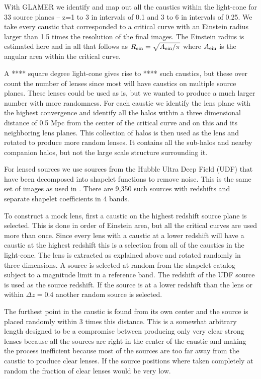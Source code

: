 \documentclass[useAMS,usenatbib]{mnras}
\begin{document}
With GLAMER we identify and map out all the caustics within the light-cone for 33 source planes -- z=1 to 3 in intervals of 0.1 and 3 to 6 in intervals of 0.25.  We take every caustic that corresponded to a critical curve with an Einstein radius larger than 1.5 times the resolution of the final images.  The Einstein radius is estimated here and in all that follows as $R_{\rm ein}=\sqrt{A_{\rm ein}/\pi}$ where $A_{\rm ein}$ is the angular area within the critical curve.

 A **** square degree light-cone gives rise to **** such caustics, but these over count the number of lenses since most will have caustics on multiple source planes.  These lenses could be used as is, but we wanted to produce a much larger number with more randomness.   For each caustic we identify the lens plane with the highest convergence and identify all the halos within a three dimensional distance of 0.5 Mpc from the center of the critical curve and on this and its neighboring lens planes.    This collection of halos is then used as the lens and rotated to produce more random lenses.    It  contains all the sub-halos and nearby companion halos, but not the large scale structure surrounding it.

For lensed sources we use sources from the Hubble Ultra Deep Field (UDF) that have been decomposed into shapelet functions to remove noise.  This is the same set of images as used 
in  \citep{2008A&A...482..403M,2010A&A...514A..93M,2016arXiv160604548M}.   There are 9,350 such sources with redshifts and separate shapelet coefficients in 4 bands.   

To construct a mock lens, first a caustic on the highest redshift source plane is selected.  This is done in order of Einstein area, but all the critical curves are used more than once.  Since every lens with a caustic at a lower redshift will have a caustic at the highest redshift this is a selection from all of the caustics in the light-cone.   The lens is extracted as explained above and rotated randomly in three dimensions.  A source is selected at random from the shapelet catalog subject to a magnitude limit in a reference band.   The redshift of the UDF source is used as the source redshift.  If the source is at a lower redshift than the lens or within $\Delta z = 0.4$ another random source is selected.

The furthest point in the caustic is found from its own center and the source is placed randomly within 3 times this distance.  This is a somewhat arbitrary length designed to be a compromise between producing only very clear strong lenses because all the sources are right in the center of the caustic and making the process  inefficient because most of the sources are too far away from the caustic to produce clear lenses.  If the source positions where taken completely at random the fraction of clear lenses would be very low.
\end{document}
